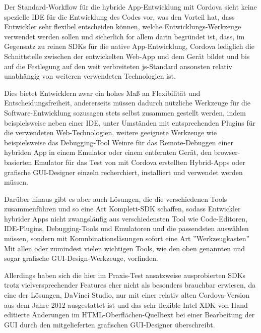 
Der Standard-Workflow für die hybride App-Entwicklung mit Cordova sieht keine spezielle IDE für die Entwicklung des Codes vor, was den Vorteil hat, dass Entwickler sehr flexibel entscheiden können, welche Entwicklungs-Werkzeuge verwendet werden sollen und sicherlich for allem darin begründet ist, dass, im Gegensatz zu reinen SDKs für die native App-Entwicklung, Cordova lediglich die Schnittstelle zwischen der entwickelten Web-App und dem Gerät bildet und bis auf die Festlegung auf den weit verbreiteten \gls{js}-Standard ansonsten relativ unabhängig von weiteren verwendeten Technologien ist.

Dies bietet Entwicklern zwar ein hohes Maß an Flexibilität und Entscheidungsfreiheit, andererseits müssen dadurch nützliche Werkzeuge für die Software-Entwicklung sozusagen stets selbst zusammen gestellt werden, indem beispielsweise neben einer IDE, unter Umständen mit entsprechenden Plugins für die verwendeten Web-Technologien, weitere geeignete Werkzeuge wie beispielsweise das Debugging-Tool Weinre für das Remote-Debuggen einer hybriden App in einem Emulator oder einem entfernten Gerät, den browser-basierten Emulator für das Test von mit Cordova erstellten Hybrid-Apps oder grafische GUI-Designer einzeln recherchiert, installiert und verwendet werden müssen. 

Darüber hinaus gibt es aber auch Lösungen, die die verschiedenen Tools zusammenführen und so eine Art Komplett-SDK schaffen, sodass Entwickler hybrider Apps nicht zwangsläufig aus verschiedensten Tool wie Code-Editoren, IDE-Plugins, Debugging-Tools und Emulatoren und die passendsten auswählen müssen, sondern mit Komnbinationsläsungen sofort eine Art ”Werkzeugkasten”  Mit allen oder zumindest vielen wichtigen Tools, wie den oben genannten und sogar grafische GUI-Design-Werkzeuge, vorfinden.




Allerdings haben sich die hier im Praxis-Test ansatzweise ausprobierten SDKs trotz vielversprechender Features eher nicht als besonders brauchbar erwiesen, da eine der Lösungen, DaVinci Studio, nur mit einer relativ alten Cordova-Version aus dem Jahre 2012 ausgestattet ist und das sehr flexible Intel XDK von Hand editierte Änderungen im HTML-Oberflächen-Quelltext bei einer Bearbeitung der GUI durch den mitgelieferten grafischen GUI-Designer überschreibt.

